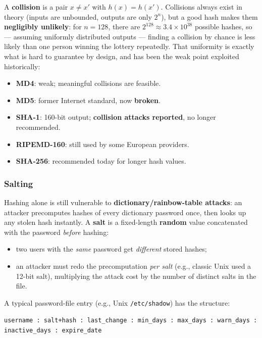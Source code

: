 \documentclass[12pt, a4paper]{article}
\begin{document}
A \textbf{collision} is a pair $x \neq x'$ with $h(x) = h(x')$. Collisions always exist in theory (inputs are unbounded, outputs are only $2^n$), but a good hash makes them \textbf{negligibly unlikely}: for $n=128$, there are $2^{128}\approx 3.4\times10^{38}$ possible hashes, so — assuming uniformly distributed outputs — finding a collision by chance is less likely than one person winning the lottery repeatedly. That uniformity is exactly what is hard to guarantee by design, and has been the weak point exploited historically:

\begin{itemize}
    \item \textbf{MD4}: weak; meaningful collisions are feasible.
    \item \textbf{MD5}: former Internet standard, now \textbf{broken}.
    \item \textbf{SHA-1}: 160-bit output; \textbf{collision attacks reported}, no longer recommended.
    \item \textbf{RIPEMD-160}: still used by some European providers.
    \item \textbf{SHA-256}: recommended today for longer hash values.
\end{itemize}

\subsubsection{Salting}
Hashing alone is still vulnerable to \textbf{dictionary/rainbow-table attacks}: an attacker precomputes hashes of every dictionary password once, then looks up any stolen hash instantly. A \textbf{salt} is a fixed-length \textbf{random} value concatenated with the password \emph{before} hashing:
\begin{itemize}
    \item two users with the \emph{same} password get \emph{different} stored hashes;
    \item an attacker must redo the precomputation \emph{per salt} (e.g., classic Unix used a 12-bit salt), multiplying the attack cost by the number of distinct salts in the file.
\end{itemize}

A typical password-file entry (e.g., Unix \texttt{/etc/shadow}) has the structure:
\begin{center}
\texttt{username : salt+hash : last\_change : min\_days : max\_days : warn\_days : inactive\_days : expire\_date}
\end{center}
\end{document}
